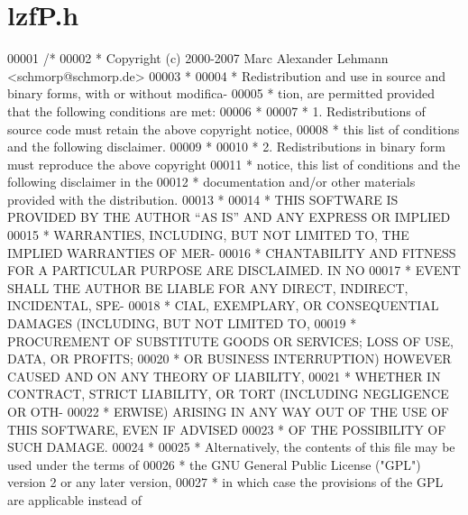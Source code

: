 \hypertarget{lzfP_8h_source}{}\section{lzf\+P.\+h}
\label{lzfP_8h_source}

\begin{DoxyCode}
00001 \textcolor{comment}{/*}
00002 \textcolor{comment}{ * Copyright (c) 2000-2007 Marc Alexander Lehmann <schmorp@schmorp.de>}
00003 \textcolor{comment}{ *}
00004 \textcolor{comment}{ * Redistribution and use in source and binary forms, with or without modifica-}
00005 \textcolor{comment}{ * tion, are permitted provided that the following conditions are met:}
00006 \textcolor{comment}{ *}
00007 \textcolor{comment}{ *   1.  Redistributions of source code must retain the above copyright notice,}
00008 \textcolor{comment}{ *       this list of conditions and the following disclaimer.}
00009 \textcolor{comment}{ *}
00010 \textcolor{comment}{ *   2.  Redistributions in binary form must reproduce the above copyright}
00011 \textcolor{comment}{ *       notice, this list of conditions and the following disclaimer in the}
00012 \textcolor{comment}{ *       documentation and/or other materials provided with the distribution.}
00013 \textcolor{comment}{ *}
00014 \textcolor{comment}{ * THIS SOFTWARE IS PROVIDED BY THE AUTHOR ``AS IS'' AND ANY EXPRESS OR IMPLIED}
00015 \textcolor{comment}{ * WARRANTIES, INCLUDING, BUT NOT LIMITED TO, THE IMPLIED WARRANTIES OF MER-}
00016 \textcolor{comment}{ * CHANTABILITY AND FITNESS FOR A PARTICULAR PURPOSE ARE DISCLAIMED.  IN NO}
00017 \textcolor{comment}{ * EVENT SHALL THE AUTHOR BE LIABLE FOR ANY DIRECT, INDIRECT, INCIDENTAL, SPE-}
00018 \textcolor{comment}{ * CIAL, EXEMPLARY, OR CONSEQUENTIAL DAMAGES (INCLUDING, BUT NOT LIMITED TO,}
00019 \textcolor{comment}{ * PROCUREMENT OF SUBSTITUTE GOODS OR SERVICES; LOSS OF USE, DATA, OR PROFITS;}
00020 \textcolor{comment}{ * OR BUSINESS INTERRUPTION) HOWEVER CAUSED AND ON ANY THEORY OF LIABILITY,}
00021 \textcolor{comment}{ * WHETHER IN CONTRACT, STRICT LIABILITY, OR TORT (INCLUDING NEGLIGENCE OR OTH-}
00022 \textcolor{comment}{ * ERWISE) ARISING IN ANY WAY OUT OF THE USE OF THIS SOFTWARE, EVEN IF ADVISED}
00023 \textcolor{comment}{ * OF THE POSSIBILITY OF SUCH DAMAGE.}
00024 \textcolor{comment}{ *}
00025 \textcolor{comment}{ * Alternatively, the contents of this file may be used under the terms of}
00026 \textcolor{comment}{ * the GNU General Public License ("GPL") version 2 or any later version,}
00027 \textcolor{comment}{ * in which case the provisions of the GPL are applicable instead of}

\end{DoxyCode}
